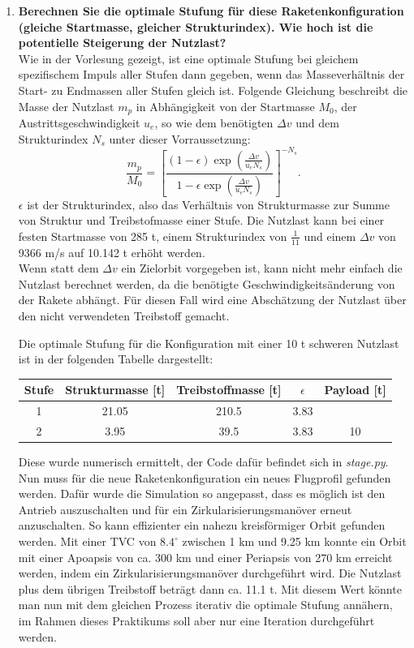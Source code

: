 \documentclass[12pt]{article}
\begin{document}
\begin{enumerate}
    \item \textbf{Berechnen Sie die optimale Stufung für diese Raketenkonfiguration (gleiche Startmasse, gleicher Strukturindex). Wie hoch ist die potentielle Steigerung der Nutzlast?}\\
    
    Wie in der Vorlesung gezeigt, ist eine optimale Stufung bei gleichem spezifischem Impuls aller Stufen dann gegeben, wenn das Masseverhältnis der Start- zu Endmassen aller Stufen gleich ist. Folgende Gleichung beschreibt die Masse der Nutzlast $m_{p}$ in Abhängigkeit von der Startmasse $M_0$, der Austrittsgeschwindigkeit $u_e$, so wie dem benötigten $\Delta v$ und dem Strukturindex $N_s$ unter dieser Vorraussetzung:
    \begin{equation}
        \frac{m_p}{M_0} = \left[ \frac{(1-\epsilon) \exp{\left( \frac{\Delta v}{u_e N_s}\right) }}{1-\epsilon \exp{ \left(\frac{\Delta v}{u_e N_s}\right)}} \right]^{-N_s}.
    \end{equation}
    $\epsilon$ ist der Strukturindex, also das Verhältnis von Strukturmasse zur Summe von Struktur und Treibstofmasse einer Stufe. Die Nutzlast kann bei einer festen Startmasse von 285 t, einem Strukturindex von $\frac{1}{11}$ und einem $\Delta v$ von 9366 m/s auf 10.142 t erhöht werden. \\

    Wenn statt dem $\Delta v$ ein Zielorbit vorgegeben ist, kann nicht mehr einfach die Nutzlast berechnet werden, da die benötigte Geschwindigkeitsänderung von der Rakete abhängt. Für diesen Fall wird eine Abschätzung der Nutzlast über den nicht verwendeten Treibstoff gemacht.

    Die optimale Stufung für die Konfiguration mit einer 10 t schweren Nutzlast ist in der folgenden Tabelle dargestellt:
    \begin{center}
        \begin{tabular}{c | c | c | c | c}
            Stufe & Strukturmasse [t] & Treibstoffmasse [t] & $\epsilon$ & Payload [t] \\
            \midrule
            1 & 21.05 & 210.5 & 3.83 &  \\
            2 & 3.95 & 39.5 & 3.83 & 10 \\
        \end{tabular}
    \end{center}
    Diese wurde numerisch ermittelt, der Code dafür befindet sich in \textit{stage.py}. Nun muss für die neue Raketenkonfiguration ein neues Flugprofil gefunden werden. Dafür wurde die Simulation so angepasst, dass es möglich ist den Antrieb auszuschalten und für ein Zirkularisierungsmanöver erneut anzuschalten. So kann effizienter ein nahezu kreisförmiger Orbit gefunden werden. Mit einer TVC von $8.4 ^\circ$ zwischen 1 km und 9.25 km konnte ein Orbit mit einer Apoapsis von ca. 300 km und einer Periapsis von 270 km erreicht werden, indem ein Zirkularisierungsmanöver durchgeführt wird. Die Nutzlast plus dem übrigen Treibstoff beträgt dann ca. 11.1 t. Mit diesem Wert könnte man nun mit dem gleichen Prozess iterativ die optimale Stufung annähern, im Rahmen dieses Praktikums soll aber nur eine Iteration durchgeführt werden.
    


\end{enumerate}
\end{document}
